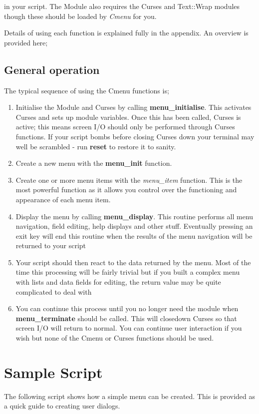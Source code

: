 \documentclass[a4paper,abstracton]{article}
\begin{document}
in your script. The Module also requires the Curses and Text::Wrap modules though these should be loaded by \textit{Cmenu} for you.

Details of using each function is explained fully in the appendix. An overview is provided here;

\subsection{General operation}
The typical sequence of using the Cmenu functions is;
\begin{enumerate}
\item Initialise the Module and Curses by calling \textbf{menu\_initialise}. This activates Curses and sets up module variables. Once this has been called, Curses is active; this means screen I/O should only be performed through Curses functions. If your script bombs before closing Curses down your terminal may well be scrambled - run \textbf{reset} to restore it to sanity.
\item Create a new menu with the \textbf{menu\_init} function.
\item Create one or more menu items with the \textit{menu\_item} function. This is the most powerful function as it allows you control over the functioning and appearance of each menu item.
\item Display the menu by calling \textbf{menu\_display}. This routine performs all menu navigation, field editing, help displays and other stuff. Eventually pressing an exit key will end this routine when the results of the menu navigation will be returned to your script
\item Your script should then react to the data returned by the menu. Most of the time this processing will be fairly trivial but if you built a complex menu with lists and data fields for editing, the return value may be quite complicated to deal with
\item You can continue this process until you no longer need the module when \textbf{menu\_terminate} should be called. This will closedown Curses so that screen I/O will return to normal. You can continue user interaction if you wish but none of the Cmenu or Curses functions should be used.
\end{enumerate}


\appendix
\section{Sample Script}
The following script shows how a simple menu can be created. This is provided as a quick guide to creating user dialogs. 
\end{document}
